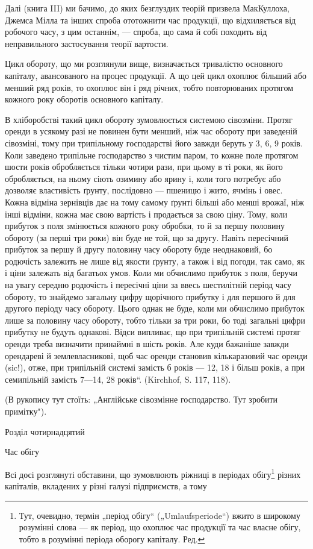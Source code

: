Далі (книга III) ми бачимо, до яких безглуздих теорій призвела МакКуллоха,
Джемса Мілла та інших спроба ототожнити час продукції, що відхиляється від робочого часу, з
цим останнім, — спроба, що сама й собі походить від неправильного застосування теорії вартости.

Цикл обороту, що ми розглянули вище, визначається тривалістю основного капіталу, авансованого на
процес продукції. А що цей цикл охоплює більший або менший ряд років, то охоплює він і ряд річних,
тобто повторюваних протягом кожного року оборотів основного капіталу.

В хліборобстві такий цикл обороту зумовлюється системою сівозміни. Протяг оренди в усякому разі не
повинен бути менший, ніж час обороту при заведеній сівозміні, тому при трипільному господарстві його
завжди беруть у 3, 6, 9 років. Коли заведено трипільне господарство з чистим паром, то кожне поле
протягом шости років обробляється тільки чотири рази, при цьому в ті роки, як його обробляється, на
ньому сіють озимину або ярину і, коли того потребує або дозволяє властивість ґрунту, послідовно —
пшеницю і жито, ячмінь і овес. Кожна відміна зернівців дає на тому самому ґрунті більші або менші
врожаї, ніж інші відміни, кожна має свою вартість і продається за свою ціну. Тому, коли прибуток з
поля змінюється кожного року обробки, то й за першу половину обороту (за перші три роки) він буде не
той, що за другу. Навіть пересічний прибуток за першу й другу половину часу обороту буде
неоднаковий, бо родючість залежить не лише від якости ґрунту, а також і від погоди, так само, як і
ціни залежать від багатьох умов. Коли ми обчислимо прибуток з поля, беручи на увагу середню
родючість і пересічні ціни за ввесь шестилітній період часу обороту, то знайдемо загальну цифру
щорічного прибутку і для першого й для другого періоду часу обороту. Цього однак не буде, коли ми
обчислимо прибуток лише за половину часу обороту, тобто тільки за три роки, бо тоді загальні цифри
прибутку не будуть однакові. Відси випливає, що при трипільній системі протяг оренди треба визначити
принаймні в шість років. Але куди бажаніше завжди орендареві й землевласникові, щоб час оренди
становив кількаразовий час оренди (sic!), отже, при трипільній системі замість б років — 12, 18 і
більш років, а при семипільній замість 7—14, 28 років“. (Kirchhof, S. 117, 118).

(В рукопису тут стоїть: „Англійське сівозмінне господарство. Тут зробити примітку").

Розділ чотирнадцятий

Час обігу

Всі досі розглянуті обставини, що зумовлюють ріжниці в періодах обігу\footnote{
Тут, очевидно, термін „період обігу“ („Umlaufsperiode“) вжито в широкому розумінні слова — як
період, що охоплює час продукції та час власне обігу, тобто в розумінні періода оборогу капіталу.
Ред.
} різних капіталів, вкладених у
різні галузі підприємств, а тому
\parbreak{}  %
